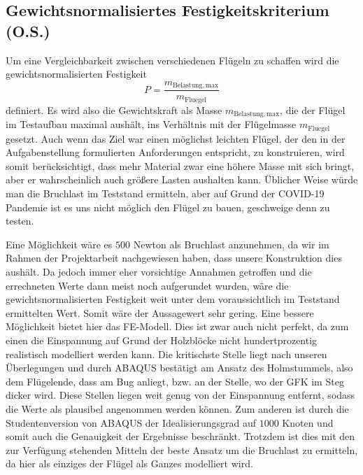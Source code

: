 \subsection{Gewichtsnormalisiertes Festigkeitskriterium (O.S.)}
Um eine Vergleichbarkeit zwischen verschiedenen Flügeln zu schaffen wird die gewichtsnormalisierten Festigkeit
\begin{equation}
	P=\frac{m_{\mathrm{Belastung,max}}}{m_{\mathrm{Fluegel}}}
\end{equation}
definiert. Es wird also die Gewichtskraft als Masse $m_{\mathrm{Belastung,max}}$, die der Flügel im Testaufbau maximal aushält, ins Verhältnis mit der Flügelmasse $m_{\mathrm{Fluegel}}$ gesetzt. Auch wenn das Ziel war einen möglichst leichten Flügel, der den in der Aufgabenstellung formulierten Anforderungen entspricht, zu konstruieren, wird somit berücksichtigt, dass mehr Material zwar eine höhere Masse mit sich bringt, aber er wahrscheinlich auch größere Lasten aushalten kann. Üblicher Weise würde man die Bruchlast im Teststand ermitteln, aber auf Grund der COVID-19 Pandemie ist es uns nicht möglich den Flügel zu bauen, geschweige denn zu testen.
	
Eine Möglichkeit wäre es $500$ Newton als Bruchlast anzunehmen, da wir im Rahmen der Projektarbeit nachgewiesen haben, dass unsere Konstruktion dies aushält. Da jedoch immer eher vorsichtige Annahmen getroffen und die errechneten Werte dann meist noch aufgerundet wurden, wäre die gewichtsnormalisierten Festigkeit weit unter dem voraussichtlich im Teststand ermittelten Wert. Somit wäre der Aussagewert sehr gering.
Eine bessere Möglichkeit bietet hier das FE-Modell. Dies ist zwar auch nicht perfekt, da zum einen die Einspannung auf Grund der Holzblöcke nicht hundertprozentig realistisch modelliert werden kann. Die kritischste Stelle liegt nach unseren Überlegungen und durch ABAQUS bestätigt am Ansatz des Holmstummels, also dem Flügelende, dass am Bug anliegt, bzw. an der Stelle, wo der GFK im Steg dicker wird. Diese Stellen liegen weit genug von der Einspannung entfernt, sodass die Werte als plausibel angenommen werden können. Zum anderen ist durch die Studentenversion von ABAQUS der Idealisierungsgrad auf $1000$ Knoten und somit auch die Genauigkeit der Ergebnisse beschränkt. Trotzdem ist dies mit den zur Verfügung stehenden Mitteln der beste Ansatz um die Bruchlast zu ermitteln, da hier als einziges der Flügel als Ganzes modelliert wird.

